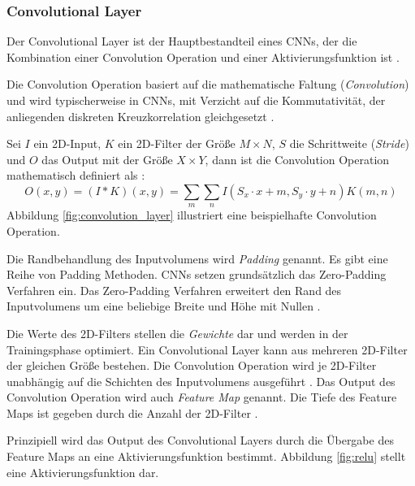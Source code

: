 \subsubsection{Convolutional Layer}
Der Convolutional Layer ist der Hauptbestandteil eines CNNs, der die Kombination einer Convolution Operation und einer Aktivierungsfunktion ist \cite{yamashitaConvolutionalNeuralNetworks2018}.

Die Convolution Operation basiert auf die mathematische Faltung (\textit{Convolution}) und wird typischerweise in CNNs, mit Verzicht auf die Kommutativität, der anliegenden diskreten Kreuzkorrelation gleichgesetzt \cite{Goodfellow-et-al-2016}.

Sei $I$ ein 2D-Input, $K$ ein 2D-Filter der Größe $M \times N$, $S$ die Schrittweite (\textit{Stride}) und $O$ das Output mit der Größe $X \times Y$, dann ist die Convolution Operation mathematisch definiert als \cite{Goodfellow-et-al-2016}:
\begin{equation}
	\label{eq:convolution}
	O(x,y) = (I * K)(x,y) = \sum_{m}\sum_{n}I(S_x \cdot x+m, S_y \cdot y+n)K(m,n)
\end{equation}
Abbildung \ref{fig:convolution_layer} illustriert eine beispielhafte Convolution Operation.

Die Randbehandlung des Inputvolumens wird \textit{Padding} genannt. Es gibt eine Reihe von Padding Methoden. CNNs setzen grundsätzlich das Zero-Padding Verfahren ein. Das Zero-Padding Verfahren erweitert den Rand  des Inputvolumens um eine beliebige Breite und Höhe mit Nullen \cite{CS231nConvolutionalNeurala}. 

Die Werte des 2D-Filters stellen die \textit{Gewichte} dar und werden in der Trainingsphase optimiert. Ein Convolutional Layer kann aus mehreren 2D-Filter der gleichen Größe bestehen. Die Convolution Operation wird je 2D-Filter unabhängig auf die Schichten des Inputvolumens ausgeführt \cite{CS231nConvolutionalNeurala}. Das Output des Convolution Operation wird auch \textit{Feature Map} genannt. Die Tiefe des Feature Maps ist gegeben durch die Anzahl der 2D-Filter \cite{yamashitaConvolutionalNeuralNetworks2018}.

Prinzipiell wird das Output des Convolutional Layers durch die Übergabe des Feature Maps an eine Aktivierungsfunktion bestimmt.  Abbildung \ref{fig:relu} stellt eine Aktivierungsfunktion dar.

